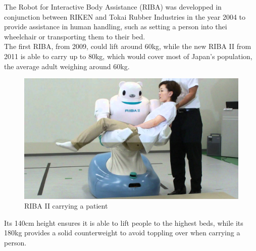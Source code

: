 The Robot for Interactive Body Assistance (RIBA) was developped in conjunction between RIKEN and Tokai Rubber Industries in the year 2004 to provide assistance in human handling, such as setting a person into thei wheelchair or transporting them to their bed.\cite{riba1}\\

The first RIBA, from 2009, could lift around 60kg, while the new RIBA II from 2011 is able to carry up to 80kg, which would cover most of Japan's population, the average adult weighing around 60kg.\cite{riba2}\cite{riba3}\\



	\begin{figure}[H]
			\centering
			\includegraphics[scale=0.2]{images/StateOfArt/riba.jpg}
			\caption{RIBA II carrying a patient}
			\label{riba}
	\end{figure}
	\bigskip

Its 140cm height ensures it is able to lift people to the highest beds, while its 180kg provides a solid counterweight to avoid toppling over when carrying a person.\\
